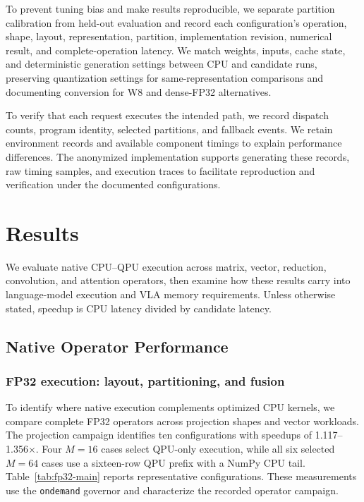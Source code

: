 \documentclass[sigplan,screen,review]{acmart}
\begin{document}
To prevent tuning bias and make results reproducible, we separate partition calibration from held-out evaluation and record each configuration's operation, shape, layout, representation, partition, implementation revision, numerical result, and complete-operation latency. We match weights, inputs, cache state, and deterministic generation settings between CPU and candidate runs, preserving quantization settings for same-representation comparisons and documenting conversion for W8 and dense-FP32 alternatives.

To verify that each request executes the intended path, we record dispatch counts, program identity, selected partitions, and fallback events. We retain environment records and available component timings to explain performance differences. The anonymized implementation supports generating these records, raw timing samples, and execution traces to facilitate reproduction and verification under the documented configurations.



\section{Results}
\label{sec:results}

We evaluate native CPU--QPU execution across matrix, vector, reduction, convolution, and attention operators, then examine how these results carry into language-model execution and VLA memory requirements. Unless otherwise stated, speedup is CPU latency divided by candidate latency.

\subsection{Native Operator Performance}

\subsubsection{FP32 execution: layout, partitioning, and fusion}

To identify where native execution complements optimized CPU kernels, we compare complete FP32 operators across projection shapes and vector workloads. The projection campaign identifies ten configurations with speedups of 1.117--1.356$\times$. Four $M=16$ cases select QPU-only execution, while all six selected $M=64$ cases use a sixteen-row QPU prefix with a NumPy CPU tail. Table~\ref{tab:fp32-main} reports representative configurations. These measurements use the \texttt{ondemand} governor and characterize the recorded operator campaign.
\end{document}
